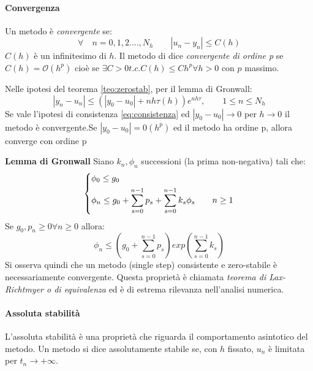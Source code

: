 \paragraph{Convergenza}
Un metodo è \emph{convergente} se: \begin{equation} \label{eq:def_convergenza}
\forall \quad n = 0,1,2....,N_h \qquad \left| u_n - y_n \right| \leq C(h)\end{equation}
$C(h)$ è un infinitesimo di $h$. 
Il metodo di dice \emph{convergente di ordine p} se $C(h) = \mathcal{O}(h^p)$ cioè se $\exists C>0 t.c. C(h) \leq Ch^p \forall h>0$ con $p$ massimo.
\begin{theorem}[Convergenza] \label{teo:converg}
Nelle ipotesi del teorema \ref{teo:zerostab}, per il lemma di Gronwall: \begin{equation}
\left|y_n - u_n\right| \leq \left(\left|y_0-u_0\right| + nh\tau(h)\right)e^{nh\tau}, \qquad 1\leq n\leq 
N_h \end{equation} 
Se vale l'ipotesi di consistenza \ref{eq:consistenza} ed $|y_0-u_0| \rightarrow 0$ per $h\rightarrow 0$ il metodo è convergente.Se $|y_0-u_0| = \mathcal{0}(h^p)$ ed il metodo ha ordine p, allora converge con ordine p \end{theorem}
\textbf{Lemma di Gronwall} \newline
Siano $k_n, \phi_n$ successioni (la prima non-negativa) tali che: \begin{equation}\begin{dcases}
\phi_0 \leq g_0 \\ \phi_n \leq g_0 + \sum_{s=0}^{n-1}p_s + \sum_{s=0}^{n-1}k_s\phi_s \qquad n\geq 1
\end{dcases} \end{equation}
Se $g_0, p_n \geq 0 \forall n \geq 0$ allora:
\begin{equation}
\phi_n \leq \left( g_0 + \sum_{s=0}^{n-1}p_s  \right)
exp \left(\sum_{s=0}^{n-1}k_s \right)
\end{equation}
Si osserva quindi che un metodo (single step) consistente e zero-stabile è necessariamente convergente. Questa proprietà è chiamata \emph{teorema di Lax-Richtmyer o di equivalenza} ed è di estrema rilevanza nell'analisi numerica.


\paragraph{Assoluta stabilità}
L'assoluta stabilità è una proprietà che riguarda il comportamento asintotico del metodo. Un metodo si dice assolutamente stabile se, con $h$ fissato, $u_n$ è limitata per $t_n\rightarrow +\infty$.

